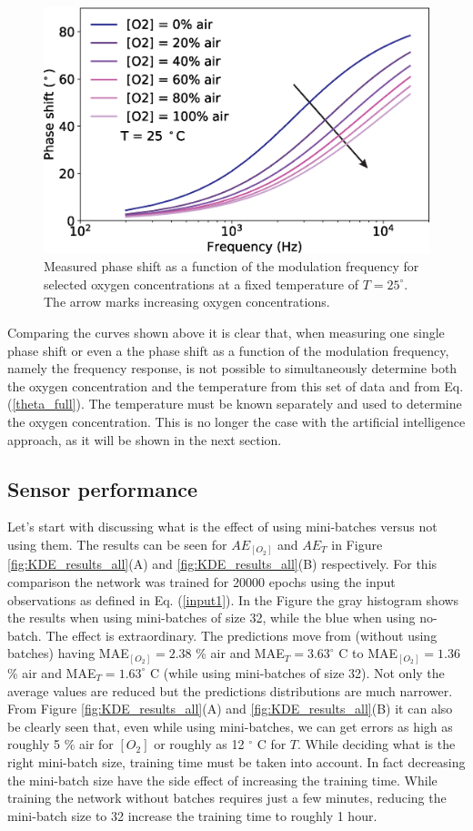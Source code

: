 \documentclass[9pt,twocolumn,twoside,pdftex]{optica}
\begin{document}
\begin{figure}[b!]
\centering
\includegraphics[width=8.2 cm]{phase_f_O2.eps}
\caption{Measured phase shift as a function of the modulation frequency for selected oxygen concentrations at a fixed temperature of $T=25 ^{\circ}$. The arrow marks increasing oxygen concentrations.}
\label{fig:expdata3}
\end{figure}

Comparing the curves shown above it is clear that, when measuring one single phase shift or even a the phase shift as a function of the modulation frequency, namely the frequency response, is not possible to simultaneously determine both the oxygen concentration and the temperature from this set of data and from Eq. (\ref{theta_full}). The temperature must be known separately and used to determine the oxygen concentration. This is no longer the case with the artificial intelligence approach, as it will be shown in the next section. 


\subsection{Sensor performance}

Let's start with discussing what is the effect of using mini-batches versus not using them. The results can be seen for  $AE_{[O_2]}$ and $AE_T$  in Figure \ref{fig:KDE_results_all}(A) and \ref{fig:KDE_results_all}(B) respectively. For this comparison the network was trained for 20000 epochs using the input observations as defined in Eq. (\ref{input1}). In the Figure the gray histogram shows the results when using mini-batches of size 32, while the blue when using no-batch. The effect is extraordinary. The predictions move from (without using batches) having MAE$_{[O_2]}=2.38$ \% air and MAE$_{T}=3.63^\circ$ C to  
MAE$_{[O_2]}=1.36$ \% air and MAE$_{T}=1.63^\circ$ C (while using mini-batches of size 32). Not only the average values are reduced but the predictions distributions are much narrower. From Figure \ref{fig:KDE_results_all}(A) and \ref{fig:KDE_results_all}(B) it can also be clearly seen that, even while using mini-batches, we can get errors as high as roughly 5 \% air for $[O_2]$ or roughly as 12 $^\circ$ C for $T$. While deciding what is the right mini-batch size, training time must be taken into account. In fact decreasing the mini-batch size have the side effect of increasing the training time. While training the network without batches requires just a few minutes, reducing the mini-batch size to 32 increase the training time to roughly 1 hour.
\end{document}
